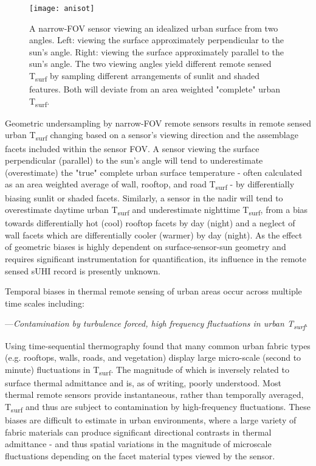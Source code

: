 \begin{bibunit}
\begin{figure}[H]
	\centering
	\texttt{[image: anisot]}
	\caption{A narrow-FOV sensor viewing an idealized urban surface from two angles. Left: viewing the surface approximately perpendicular to the sun's angle. Right: viewing the surface approximately parallel to the sun's angle. The two viewing angles yield different remote sensed T\textsubscript{surf} by sampling different arrangements of sunlit and shaded features. Both will deviate from an area weighted "complete" urban T\textsubscript{surf}.}
	\label{anisot}
\end{figure}

Geometric undersampling by narrow-FOV remote sensors results in remote sensed urban T\textsubscript{surf} changing based on a sensor's viewing direction and the assemblage facets included within the sensor FOV. A sensor viewing the surface perpendicular (parallel) to the sun's angle will tend to underestimate (overestimate) the "true" complete urban surface temperature - often calculated as an area weighted average of wall, rooftop, and road T\textsubscript{surf} - by differentially biasing sunlit or shaded facets. Similarly, a sensor in the nadir will tend to overestimate daytime urban T\textsubscript{surf} and underestimate nighttime T\textsubscript{surf}, from a bias towards differentially hot (cool) rooftop facets by day (night) and a neglect of wall facets which are differentially cooler (warmer) by day (night). As the effect of geometric biases is highly dependent on surface-sensor-sun geometry and requires significant instrumentation for quantification, its influence in the remote sensed sUHI record is presently unknown.

Temporal biases in thermal remote sensing of urban areas occur across multiple time scales including: 

\noindent---\textit{Contamination by turbulence forced, high frequency fluctuations in urban T\textsubscript{surf}}. 

Using time-sequential thermography \citet{Christen2012} found that many common urban fabric types (e.g. rooftops, walls, roads, and vegetation) display large micro-scale (second to minute) fluctuations in T\textsubscript{surf}. The magnitude of which is inversely related to surface thermal admittance and is, as of writing, poorly understood. Most thermal remote sensors provide instantaneous, rather than temporally averaged, T\textsubscript{surf} and thus are subject to contamination by high-frequency fluctuations. These biases are difficult to estimate in urban environments, where a large variety of fabric materials can produce significant directional contrasts in thermal admittance - and thus spatial variations in the magnitude of microscale fluctuations depending on the facet material types viewed by the sensor. 


\end{bibunit}
